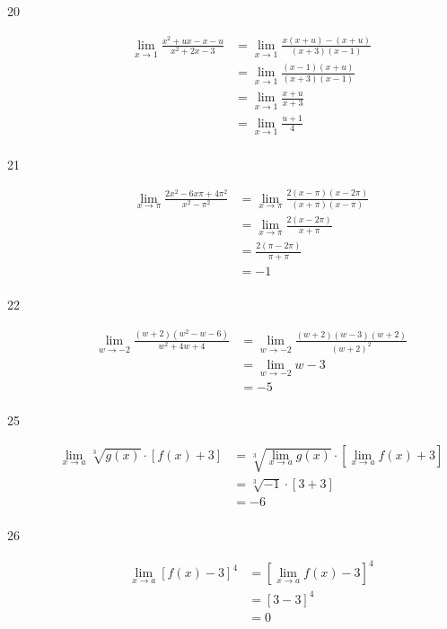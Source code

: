 \documentclass{exam}
\begin{document}
\begin{description}
\item[20]
\begin{align*}
  \lim_{x \to 1} \frac{x^2 + ux - x - u}{x^2 + 2x - 3} &= \lim_{x \to 1} \frac{x(x + u) - (x + u)}{(x+3)(x-1)} \\
   &= \lim_{x \to 1} \frac{(x-1)(x + u)}{(x+3)(x-1)} \\
   &= \lim_{x \to 1} \frac{x + u}{x+3} \\
   &= \lim_{x \to 1} \frac{u + 1}{4} \\
\end{align*}

\item[21]
\begin{align*}
  \lim_{x \to \pi} \frac{2x^2 - 6x\pi + 4\pi^2}{x^2 - \pi^2} &= \lim_{x \to \pi} \frac{2(x - \pi)(x - 2\pi)}{(x+\pi)(x - \pi)} \\
   &= \lim_{x \to \pi} \frac{2(x - 2\pi)}{x+\pi} \\
   &= \frac{2(\pi - 2\pi)}{\pi+\pi} \\
   &= -1 \\
\end{align*}

\item[22]
\begin{align*}
  \lim_{w \to -2} \frac{(w+2)(w^2 - w - 6)}{w^2 + 4w + 4} &= \lim_{w \to -2} \frac{(w+2)(w-3)(w+2)}{(w+2)^2} \\
   &= \lim_{w \to -2} w-3 \\
   &= -5 \\
\end{align*}

\item[25]
\begin{align*}
  \lim_{x \to a} \sqrt[3]{g(x)} \cdot [f(x) + 3] &= \sqrt[3]{\lim_{x \to a} g(x)} \cdot \left[\lim_{x \to a} f(x) + 3 \right] \\
   &= \sqrt[3]{-1} \cdot [3 + 3] \\
   &= -6 \\
\end{align*}

\item[26]
\begin{align*}
  \lim_{x \to a} \left[ f(x) - 3\right]^4 &= \left[ \lim_{x \to a} f(x) - 3\right]^4 \\
   &= \left[3 - 3\right]^4 \\
   &= 0 \\
\end{align*}


\end{description}
\end{document}
